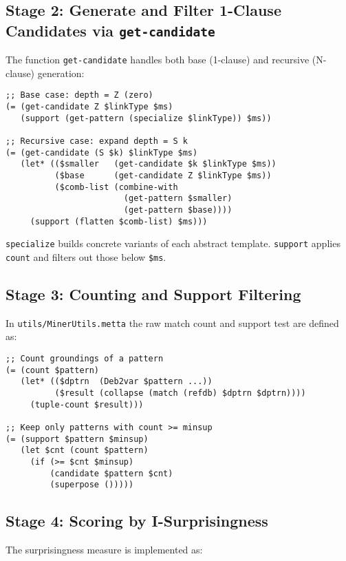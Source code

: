 \documentclass{article}
\begin{document}
\subsection{Stage 2: Generate and Filter 1-Clause Candidates via \texttt{get-candidate}}

The function \texttt{get-candidate} handles both base (1-clause) and recursive (N-clause) generation:

\begin{verbatim}
;; Base case: depth = Z (zero)
(= (get-candidate Z $linkType $ms)
   (support (get-pattern (specialize $linkType)) $ms))

;; Recursive case: expand depth = S k
(= (get-candidate (S $k) $linkType $ms)
   (let* (($smaller   (get-candidate $k $linkType $ms))
          ($base      (get-candidate Z $linkType $ms))
          ($comb-list (combine-with
                        (get-pattern $smaller)
                        (get-pattern $base))))
     (support (flatten $comb-list) $ms)))
\end{verbatim}

\noindent
\texttt{specialize} builds concrete variants of each abstract template.  \texttt{support} applies \texttt{count} and filters out those below \texttt{\$ms}.

\subsection{Stage 3: Counting and Support Filtering}

In \texttt{utils/MinerUtils.metta} the raw match count and support test are defined as:

\begin{verbatim}
;; Count groundings of a pattern
(= (count $pattern)
   (let* (($dptrn  (Deb2var $pattern ...))
          ($result (collapse (match (refdb) $dptrn $dptrn))))
     (tuple-count $result)))

;; Keep only patterns with count >= minsup
(= (support $pattern $minsup)
   (let $cnt (count $pattern)
     (if (>= $cnt $minsup)
         (candidate $pattern $cnt)
         (superpose ()))))
\end{verbatim}

\subsection{Stage 4: Scoring by I-Surprisingness}

The surprisingness measure is implemented as:
\end{document}
